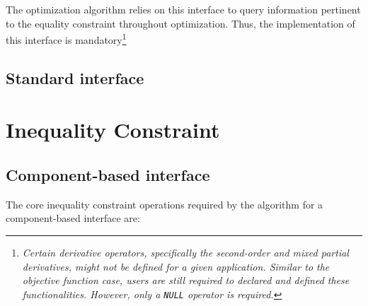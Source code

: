         The optimization algorithm relies on this interface to query information pertinent to the equality constraint throughout optimization. Thus, the implementation of this interface is mandatory\footnote{\emph{Certain derivative operators, specifically the second-order and mixed partial derivatives, might not be defined for a given application. Similar to the objective function case, users are still required to declared and defined these functionalities. However, only a \texttt{NULL} operator is required.}}
        
    \subsection{Standard interface}\label{subsec:EqualityStandardAPI}
    
        
    \section{Inequality Constraint}\label{sec:InequalityAPI}
    
    \subsection{Component-based interface}\label{subsec:InequalityComponentAPI}
    
    The core inequality constraint operations required by the algorithm for a component-based interface are: 
    
